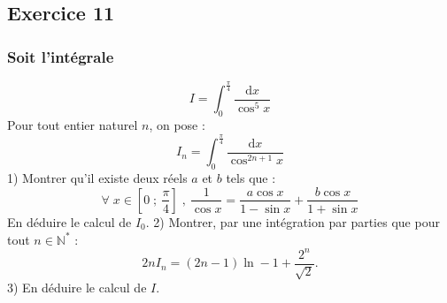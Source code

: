 \documentclass[12pt]{article}
\begin{document}
\subsection*{Exercice 11}
\subsubsection*{Soit l'intégrale}
\[I=\int_{0}^{\frac{\pi}{4}}\dfrac{\mathrm{d}x}{\cos^{5}x}\]
Pour tout entier naturel \(n\), on pose :
\[I_{n}=\int_{0}^{\frac{\pi}{4}}\dfrac{\mathrm{d}x}{\cos^{2n+1}x}\]
1) Montrer qu'il existe deux réels \(a\) et \(b\) tels que :
\[\forall \;x\in\left[0\;;\ \dfrac{\pi}{4}\right]\;,\ \dfrac{1}{\cos x}=\dfrac{a\cos x}{1-\sin x}+\dfrac{b\cos x}{1+\sin x}\]
En déduire le calcul de \(I_{0}.\)
2) Montrer, par une intégration par parties que pour tout \(n\in\mathbb{N}^{\ast}\) :
\[2 nI_{n}=(2 n-1)\ln-1+\dfrac{2^{n}}{\sqrt{2}}.\]
3) En déduire le calcul de \(I.\)
\end{document}
